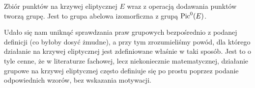 \begin{corollary}
Zbiór punktów na krzywej eliptycznej $E$
wraz z operacją dodawania punktów
tworzą grupę.
Jest to grupa abelowa izomorficzna z grupą $\operatorname{Pic}^0(E)$.
\end{corollary}

\noindent
Udało się nam uniknąć sprawdzania praw grupowych
bezpośrednio z podanej definicji (co byłoby dosyć żmudne),
a przy tym zrozumieliśmy powód,
dla którego działanie na krzywej eliptycznej jest zdefiniowane
właśnie w taki sposób.
Jest to o tyle cenne,
że w literaturze fachowej, lecz niekoniecznie matematycznej,
działanie grupowe na krzywej eliptycznej
często definiuje się po prostu poprzez podanie odpowiednich wzorów,
bez wskazania motywacji.
